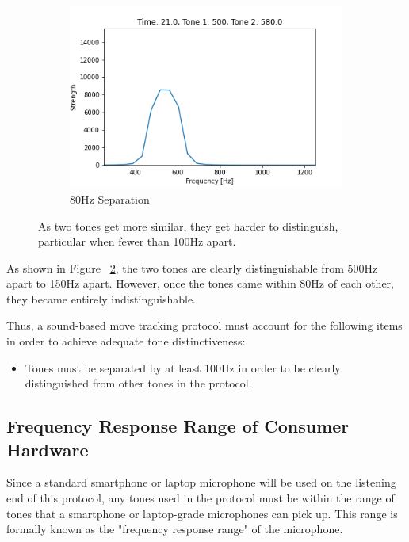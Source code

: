\begin{figure}[h]
    \begin{subfigure}{0.33\textwidth}
        \centering
        \includegraphics[width=.90\linewidth]{Figures/4 Protocol Design/Tone Distinctiveness/21.01.png}
        \caption{80Hz Separation}
        \label{fig:tone-sep-80}
    \end{subfigure}%
    \caption{As two tones get more similar, they get harder to distinguish, particular when fewer than 100Hz apart.}
    \label{fig:tone-sep}
\end{figure}

As shown in Figure ~\ref{fig:tone-sep}, the two tones are clearly distinguishable from 500Hz apart to 150Hz apart.
However, once the tones came within 80Hz of each other, they became entirely indistinguishable.

Thus, a sound-based move tracking protocol must account for the following items in order to achieve adequate tone distinctiveness:
\begin{itemize}
    \item Tones must be separated by at least 100Hz in order to be clearly distinguished from other tones in the protocol.
\end{itemize}


\subsection{Frequency Response Range of Consumer Hardware}
\label{subsec:frequency-response-range}
Since a standard smartphone or laptop microphone will be used on the listening end of this protocol, any tones used in the protocol must be within the range of tones that a smartphone or laptop-grade microphones can pick up.
This range is formally known as the "frequency response range" of the microphone.

